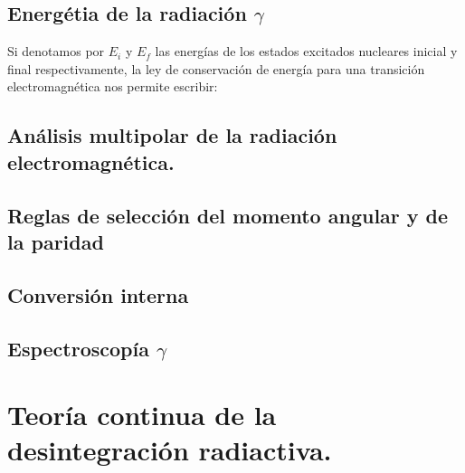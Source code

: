 \subsection{Energétia de la radiación $\gamma$}

Si denotamos por $E_i$ y $E_f$ las energías de los estados excitados nucleares inicial y final respectivamente, la ley de conservación de energía para una transición electromagnética nos permite escribir:


\Revisar

\subsection{Análisis multipolar de la radiación electromagnética.}


\subsection{Reglas de selección del momento angular y de la paridad}

\subsection{Conversión interna}


\subsection{Espectroscopía $\gamma$}


\section{Teoría continua de la desintegración radiactiva.}

